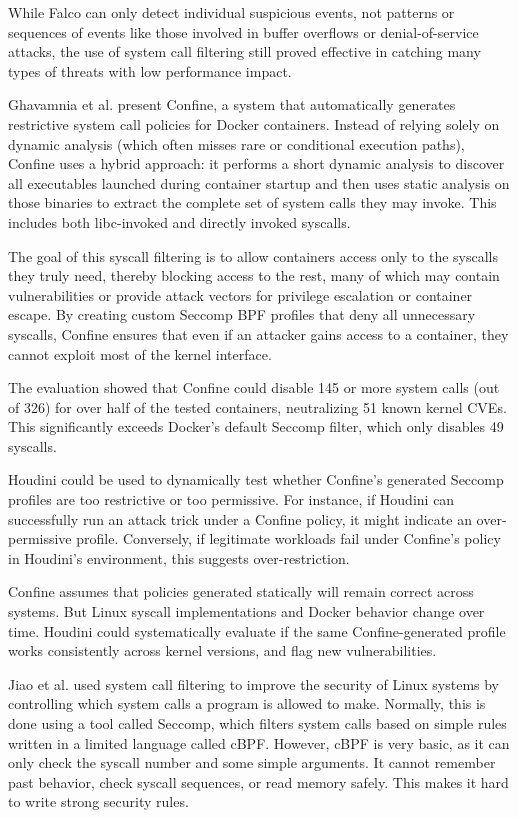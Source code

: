 \documentclass[12pt]{report}
\begin{document}
\begin{doublespace}
While Falco can only detect individual suspicious events, not patterns or sequences of events like those involved in buffer overflows or denial-of-service attacks, the use of system call filtering still proved effective in catching many types of threats with low performance impact.

Ghavamnia et al. \cite{ghavamnia2020confine} present Confine, a system that automatically generates restrictive system call policies for Docker containers. Instead of relying solely on dynamic analysis (which often misses rare or conditional execution paths), Confine uses a hybrid approach: it performs a short dynamic analysis to discover all executables launched during container startup and then uses static analysis on those binaries to extract the complete set of system calls they may invoke. This includes both libc-invoked and directly invoked syscalls.

The goal of this syscall filtering is to allow containers access only to the syscalls they truly need, thereby blocking access to the rest, many of which may contain vulnerabilities or provide attack vectors for privilege escalation or container escape. By creating custom Seccomp BPF profiles that deny all unnecessary syscalls, Confine ensures that even if an attacker gains access to a container, they cannot exploit most of the kernel interface.

The evaluation showed that Confine could disable 145 or more system calls (out of 326) for over half of the tested containers, neutralizing 51 known kernel CVEs. This significantly exceeds Docker’s default Seccomp filter, which only disables 49 syscalls.

Houdini could be used to dynamically test whether Confine’s generated Seccomp profiles are too restrictive or too permissive. For instance, if Houdini can successfully run an attack trick under a Confine policy, it might indicate an over-permissive profile. Conversely, if legitimate workloads fail under Confine’s policy in Houdini’s environment, this suggests over-restriction.

Confine assumes that policies generated statically will remain correct across systems. But Linux syscall implementations and Docker behavior change over time. Houdini could systematically evaluate if the same Confine-generated profile works consistently across kernel versions, and flag new vulnerabilities.

Jiao et al. \cite{jia2023programmable} used system call filtering to improve the security of Linux systems by controlling which system calls a program is allowed to make. Normally, this is done using a tool called Seccomp, which filters system calls based on simple rules written in a limited language called cBPF. However, cBPF is very basic, as it can only check the syscall number and some simple arguments. It cannot remember past behavior, check syscall sequences, or read memory safely. This makes it hard to write strong security rules.


\end{doublespace}
\end{document}
